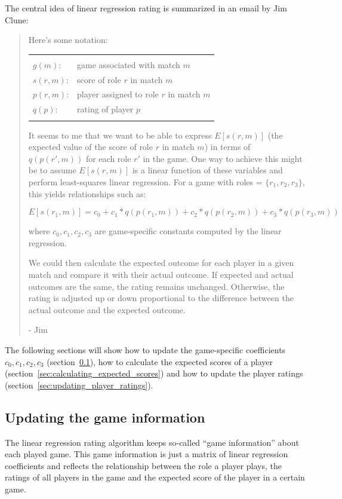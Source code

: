 \documentclass[a4paper,10pt]{article}
\begin{document}
The central idea of linear regression rating is summarized in an email by Jim Clune:
\begin{quotation}
Here's some notation:

\begin{tabular}{ll}
&\\
$g(m)$:    & game associated with match $m$ \\
$s(r, m)$: & score of role $r$ in match $m$ \\
$p(r, m)$: & player assigned to role $r$ in match $m$ \\
$q(p)$:    & rating of player $p$ \\
&
\end{tabular}

It seems to me that we want to be able to express $E[s(r, m)]$ (the
expected value of the score of role $r$ in match $m$) in terms of $q(p(r', m))$
for each role $r'$ in the game. One way to achieve this might be to assume
$E[s(r, m)]$ is a linear function of these variables and perform least-squares
linear regression. For a game with roles = $\{r_1, r_2, r_3\}$, this yields
relationships such as:

\[E[s(r_1, m)] = c_0 + c_1*q(p(r_1, m)) + c_2*q(p(r_2, m)) + c_3*q(p(r_3, m))\]

where $c_0, c_1, c_2, c_3$ are game-specific constants computed by the linear
regression.

We could then calculate the expected outcome for each player in a
given match and compare it with their actual outcome. If expected and
actual outcomes are the same, the rating remains unchanged.
Otherwise, the rating is adjusted up or down proportional to the
difference between the actual outcome and the expected outcome.

- Jim
\end{quotation}

The following sections will show how to update the game-specific coefficients
$c_0, c_1, c_2, c_3$ (section~\ref{sec:updating_game_information}), how to
calculate the expected scores of a player
(section~\ref{sec:calculating_expected_scores}) and how to update the player
ratings (section~\ref{sec:updating_player_ratings}).

\subsection{Updating the game information}
\label{sec:updating_game_information}

The linear regression rating algorithm keeps so-called ``game information''
about each played game. This game information is just a matrix of linear
regression coefficients and reflects the relationship between the role a player
plays, the ratings of all players in the game and the expected score of the
player in a certain game.
\end{document}
